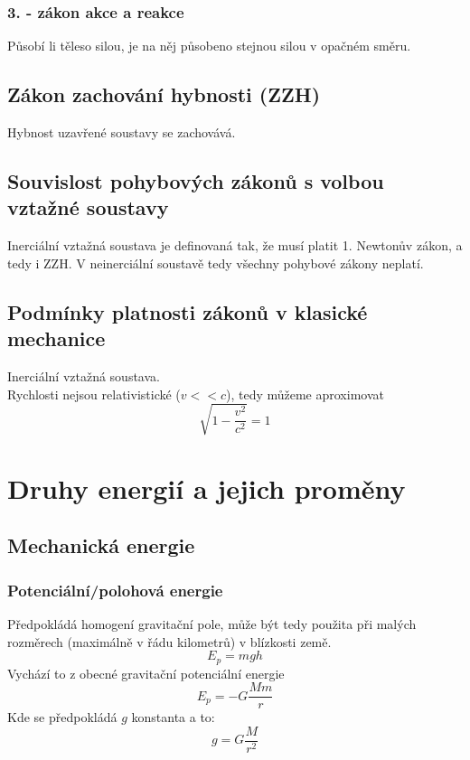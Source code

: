 \documentclass[titlepage]{book}
\begin{document}
\subsection{3. - zákon akce a reakce}
Působí li těleso silou, je na něj působeno stejnou silou v opačném směru.
\section{Zákon zachování hybnosti (ZZH)}
Hybnost uzavřené soustavy se zachovává.
\section{Souvislost pohybových zákonů s volbou vztažné soustavy}
Inerciální vztažná soustava je definovaná tak, že musí platit 1. Newtonův zákon, a tedy i ZZH. V neinerciální soustavě tedy všechny pohybové zákony neplatí.
\section{Podmínky platnosti zákonů v klasické mechanice}
Inerciální vztažná soustava.\\
Rychlosti nejsou relativistické ($v << c$), tedy můžeme aproximovat\\
\begin{equation}
\sqrt{1-\frac{v^2}{c^2}} = 1
\end{equation}
\chapter{Druhy energií a jejich proměny}
\section{Mechanická energie}
\subsection{Potenciální/polohová energie}
Předpokládá homogení gravitační pole, může být tedy použita při malých rozměrech (maximálně v řádu kilometrů) v blízkosti země.\\
\begin{equation}
E_p = mgh
\end{equation}
Vychází to z obecné gravitační potenciální energie
\begin{equation}
E_p = -G\frac{Mm}{r}
\end{equation}
Kde se předpokládá $g$ konstanta a to:
\begin{equation}
g = G\frac{M}{r^2}
\end{equation}
\end{document}
